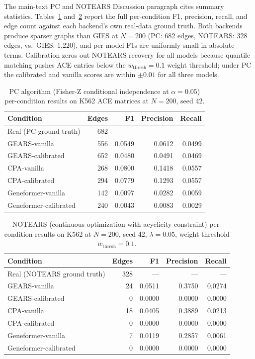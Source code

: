 \documentclass{article}
\theoremstyle{plain}
\theoremstyle{definition}
\theoremstyle{remark}
\begin{document}
The main-text PC and NOTEARS Discussion paragraph cites summary statistics. Tables~\ref{tab:pc_full} and~\ref{tab:notears_full} report the full per-condition F1, precision, recall, and edge count against each backend's own real-data ground truth. Both backends produce sparser graphs than GIES at $N{=}200$ (PC: 682 edges, NOTEARS: 328 edges, vs.\ GIES: 1{,}220), and per-model F1s are uniformly small in absolute terms. Calibration zeros out NOTEARS recovery for all models because quantile matching pushes ACE entries below the $w_{\mathrm{thresh}}{=}0.1$ weight threshold; under PC the calibrated and vanilla scores are within $\pm 0.01$ for all three models.

\begin{table}[h]
\centering
\small
\begin{tabular}{lrrrr}
\toprule
\textbf{Condition} & \textbf{Edges} & \textbf{F1} & \textbf{Precision} & \textbf{Recall} \\
\midrule
Real (PC ground truth)   & 682 & --- & --- & --- \\
GEARS-vanilla            & 556 & 0.0549 & 0.0612 & 0.0499 \\
GEARS-calibrated         & 652 & 0.0480 & 0.0491 & 0.0469 \\
CPA-vanilla              & 268 & 0.0800 & 0.1418 & 0.0557 \\
CPA-calibrated           & 294 & 0.0779 & 0.1293 & 0.0557 \\
Geneformer-vanilla       & 142 & 0.0097 & 0.0282 & 0.0059 \\
Geneformer-calibrated    & 240 & 0.0043 & 0.0083 & 0.0029 \\
\bottomrule
\end{tabular}
\caption{PC algorithm (Fisher-Z conditional independence at $\alpha{=}0.05$) per-condition results on K562 ACE matrices at $N{=}200$, seed 42.}
\label{tab:pc_full}
\end{table}

\begin{table}[h]
\centering
\small
\begin{tabular}{lrrrr}
\toprule
\textbf{Condition} & \textbf{Edges} & \textbf{F1} & \textbf{Precision} & \textbf{Recall} \\
\midrule
Real (NOTEARS ground truth) & 328 & --- & --- & --- \\
GEARS-vanilla            & 24  & 0.0511 & 0.3750 & 0.0274 \\
GEARS-calibrated         & 0   & 0.0000 & 0.0000 & 0.0000 \\
CPA-vanilla              & 18  & 0.0405 & 0.3889 & 0.0213 \\
CPA-calibrated           & 0   & 0.0000 & 0.0000 & 0.0000 \\
Geneformer-vanilla       & 7   & 0.0119 & 0.2857 & 0.0061 \\
Geneformer-calibrated    & 0   & 0.0000 & 0.0000 & 0.0000 \\
\bottomrule
\end{tabular}
\caption{NOTEARS (continuous-optimization with acyclicity constraint) per-condition results on K562 at $N{=}200$, seed 42, $\lambda{=}0.05$, weight threshold $w_{\mathrm{thresh}}{=}0.1$.}
\label{tab:notears_full}
\end{table}
\end{document}
